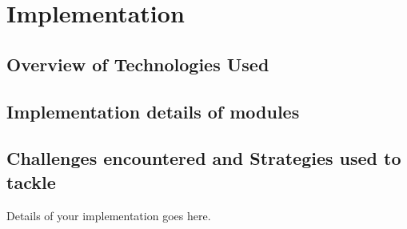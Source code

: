 \chapter{Implementation}
\section{Overview of Technologies Used}
\section{Implementation details of modules}
\section{Challenges encountered and Strategies used to tackle}

Details of your implementation goes here.
